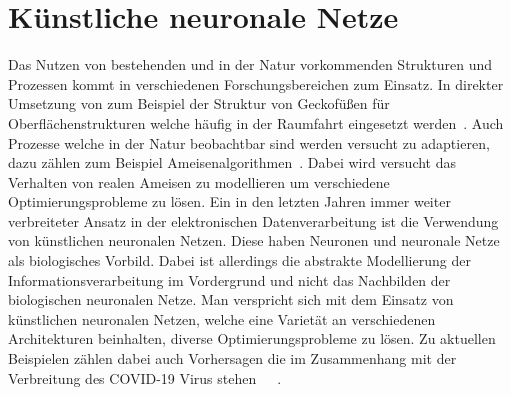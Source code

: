     \section{Künstliche neuronale Netze}\label{sec:KNN}        
        Das Nutzen von bestehenden und in der Natur vorkommenden Strukturen und Prozessen kommt in verschiedenen Forschungsbereichen zum Einsatz.
        In direkter Umsetzung von zum Beispiel der Struktur von Geckofüßen für Oberflächenstrukturen welche häufig in der Raumfahrt eingesetzt werden~\cite{GECKO}.
        Auch Prozesse welche in der Natur beobachtbar sind werden versucht zu adaptieren, dazu zählen zum Beispiel Ameisenalgorithmen~\cite{ANT}.
        Dabei wird versucht das Verhalten von realen Ameisen zu modellieren um verschiedene Optimierungsprobleme zu lösen.
        Ein in den letzten Jahren immer weiter verbreiteter Ansatz in der elektronischen Datenverarbeitung ist die Verwendung von künstlichen neuronalen Netzen.
        Diese haben Neuronen und neuronale Netze als biologisches Vorbild.
        Dabei ist allerdings die abstrakte Modellierung der Informationsverarbeitung im Vordergrund und nicht das Nachbilden der biologischen neuronalen Netze.
        Man verspricht sich mit dem Einsatz von künstlichen neuronalen Netzen, welche eine Varietät an verschiedenen Architekturen beinhalten, diverse Optimierungsprobleme zu lösen.
        Zu aktuellen Beispielen zählen dabei auch Vorhersagen die im Zusammenhang mit der Verbreitung des COVID-19 Virus stehen~\cite{COVID1}~\cite{COVID2}~\cite{COVID3}.
        
